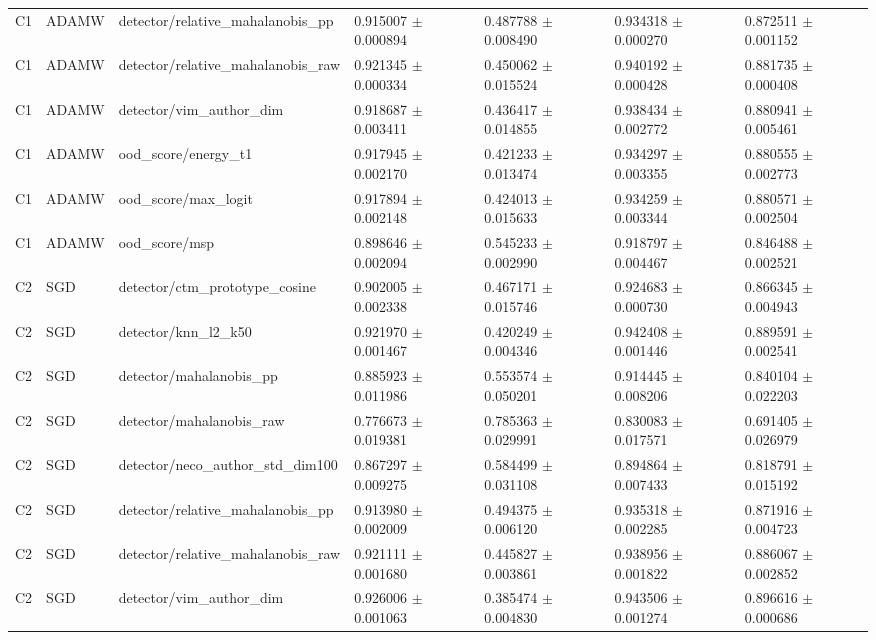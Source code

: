 \begin{longtable}{lllllll}
C1 & ADAMW & detector/relative\_mahalanobis\_pp & 0.915007 $\pm$ 0.000894 & 0.487788 $\pm$ 0.008490 & 0.934318 $\pm$ 0.000270 & 0.872511 $\pm$ 0.001152 \\
C1 & ADAMW & detector/relative\_mahalanobis\_raw & 0.921345 $\pm$ 0.000334 & 0.450062 $\pm$ 0.015524 & 0.940192 $\pm$ 0.000428 & 0.881735 $\pm$ 0.000408 \\
C1 & ADAMW & detector/vim\_author\_dim & 0.918687 $\pm$ 0.003411 & 0.436417 $\pm$ 0.014855 & 0.938434 $\pm$ 0.002772 & 0.880941 $\pm$ 0.005461 \\
C1 & ADAMW & ood\_score/energy\_t1 & 0.917945 $\pm$ 0.002170 & 0.421233 $\pm$ 0.013474 & 0.934297 $\pm$ 0.003355 & 0.880555 $\pm$ 0.002773 \\
C1 & ADAMW & ood\_score/max\_logit & 0.917894 $\pm$ 0.002148 & 0.424013 $\pm$ 0.015633 & 0.934259 $\pm$ 0.003344 & 0.880571 $\pm$ 0.002504 \\
C1 & ADAMW & ood\_score/msp & 0.898646 $\pm$ 0.002094 & 0.545233 $\pm$ 0.002990 & 0.918797 $\pm$ 0.004467 & 0.846488 $\pm$ 0.002521 \\
C2 & SGD & detector/ctm\_prototype\_cosine & 0.902005 $\pm$ 0.002338 & 0.467171 $\pm$ 0.015746 & 0.924683 $\pm$ 0.000730 & 0.866345 $\pm$ 0.004943 \\
C2 & SGD & detector/knn\_l2\_k50 & 0.921970 $\pm$ 0.001467 & 0.420249 $\pm$ 0.004346 & 0.942408 $\pm$ 0.001446 & 0.889591 $\pm$ 0.002541 \\
C2 & SGD & detector/mahalanobis\_pp & 0.885923 $\pm$ 0.011986 & 0.553574 $\pm$ 0.050201 & 0.914445 $\pm$ 0.008206 & 0.840104 $\pm$ 0.022203 \\
C2 & SGD & detector/mahalanobis\_raw & 0.776673 $\pm$ 0.019381 & 0.785363 $\pm$ 0.029991 & 0.830083 $\pm$ 0.017571 & 0.691405 $\pm$ 0.026979 \\
C2 & SGD & detector/neco\_author\_std\_dim100 & 0.867297 $\pm$ 0.009275 & 0.584499 $\pm$ 0.031108 & 0.894864 $\pm$ 0.007433 & 0.818791 $\pm$ 0.015192 \\
C2 & SGD & detector/relative\_mahalanobis\_pp & 0.913980 $\pm$ 0.002009 & 0.494375 $\pm$ 0.006120 & 0.935318 $\pm$ 0.002285 & 0.871916 $\pm$ 0.004723 \\
C2 & SGD & detector/relative\_mahalanobis\_raw & 0.921111 $\pm$ 0.001680 & 0.445827 $\pm$ 0.003861 & 0.938956 $\pm$ 0.001822 & 0.886067 $\pm$ 0.002852 \\
C2 & SGD & detector/vim\_author\_dim & 0.926006 $\pm$ 0.001063 & 0.385474 $\pm$ 0.004830 & 0.943506 $\pm$ 0.001274 & 0.896616 $\pm$ 0.000686 \\

\end{longtable}

